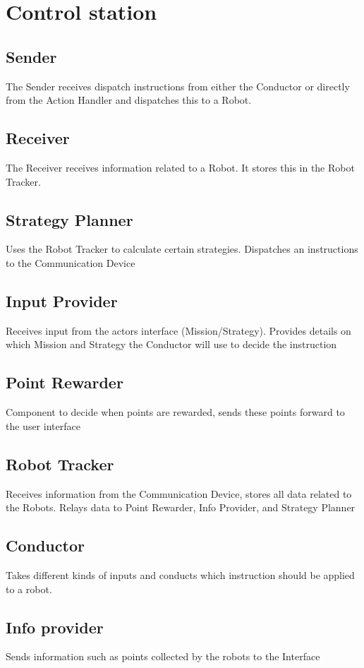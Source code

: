 \section{Control station}
\subsection{Sender}
The Sender receives dispatch instructions from either the Conductor or directly from the Action Handler and dispatches this to a Robot.
\subsection{Receiver}
The Receiver receives information related to a Robot. It stores this in the Robot Tracker.
\subsection{Strategy Planner}
Uses the Robot Tracker to calculate certain strategies. Dispatches an instructions to the Communication Device
\subsection{Input Provider}
Receives input from the actors interface (Mission/Strategy). Provides details on which Mission and Strategy the Conductor will use to decide the instruction
\subsection{Point Rewarder}
Component to decide when points are rewarded, sends these points forward to the user interface
\subsection{Robot Tracker}
Receives information from the Communication Device, stores all data related to the Robots. Relays data to Point Rewarder, Info Provider, and Strategy Planner
\subsection{Conductor}
Takes different kinds of inputs and conducts which instruction should be applied to a robot.
\subsection{Info provider}
Sends information such as points collected by the robots to the Interface

